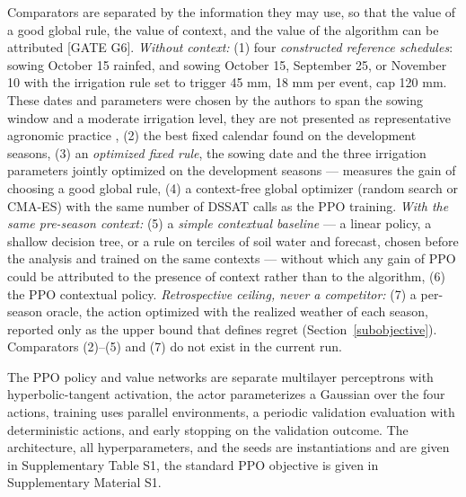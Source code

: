 \documentclass[times,final,authoryear]{elsarticle}
\begin{document}
Comparators are separated by the information they may use, so that the value of a good global rule, the value of context, and the value of the algorithm can be attributed [GATE G6]. \emph{Without context:} (1) four \emph{constructed reference schedules}: sowing October 15 rainfed, and sowing October 15, September 25, or November 10 with the irrigation rule set to trigger 45 mm, 18 mm per event, cap 120 mm. These dates and parameters were chosen by the authors to span the sowing window and a moderate irrigation level, they are not presented as representative agronomic practice , (2) the best fixed calendar found on the development seasons, (3) an \emph{optimized fixed rule}, the sowing date and the three irrigation parameters jointly optimized on the development seasons --- measures the gain of choosing a good global rule, (4) a context-free global optimizer (random search or CMA-ES) with the same number of DSSAT calls as the PPO training. \emph{With the same pre-season context:} (5) a \emph{simple contextual baseline} --- a linear policy, a shallow decision tree, or a rule on terciles of soil water and forecast, chosen before the analysis and trained on the same contexts --- without which any gain of PPO could be attributed to the presence of context rather than to the algorithm, (6) the PPO contextual policy. \emph{Retrospective ceiling, never a competitor:} (7) a per-season oracle, the action optimized with the realized weather of each season, reported only as the upper bound that defines regret (Section~\ref{subobjective}). Comparators (2)--(5) and (7)  do not exist in the current run.

The PPO policy and value networks are separate multilayer perceptrons with hyperbolic-tangent activation, the actor parameterizes a Gaussian over the four actions, training uses parallel environments, a periodic validation evaluation with deterministic actions, and early stopping on the validation outcome. The architecture, all hyperparameters, and the seeds are instantiations and are given in Supplementary Table S1, the standard PPO objective is given in Supplementary Material S1.
\end{document}
